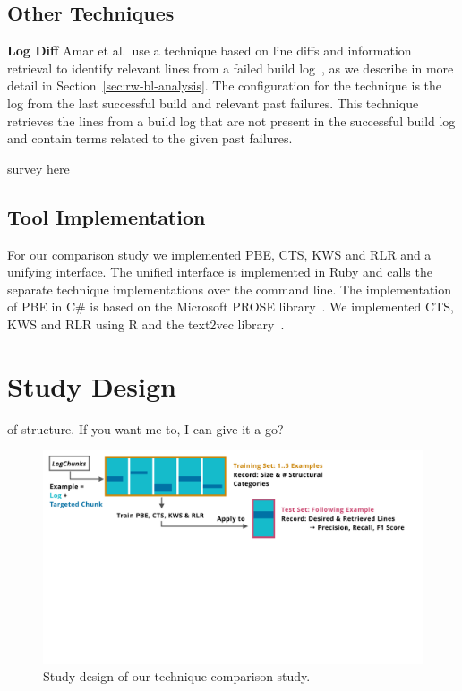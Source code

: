 
\subsection{Other Techniques}

\noindent
\textbf{Log Diff}
Amar et al.\ use a technique based on line diffs and information
retrieval to identify relevant lines from a failed build
log~\cite{amar2019mining}, as we describe in more detail in
Section~\ref{sec:rw-bl-analysis}.
The configuration for the technique
is the log from the last successful build and relevant past failures.
This technique retrieves the lines from a build log that are not
present in the successful build log and contain terms related to the
given past failures.

survey here

\subsection{Tool Implementation}
For our comparison study we implemented PBE, CTS, KWS and RLR and a
unifying interface.
The unified interface is implemented in Ruby and
calls the separate technique implementations over the command line.
The implementation of PBE in C\# is based on the Microsoft PROSE
library~\cite{prose2019webpage}.
We implemented CTS, KWS and RLR using
R and the text2vec library~\cite{text2vec2019webpage}.


\section{Study Design}
\label{sec:study}

of structure.
If you want me to, I can give it a go?
\begin{figure}[tb]
	\centering
	\includegraphics[width=\textwidth, trim={0.4cm 8.4cm 1.2cm 0.3cm},
	clip]{img/study.pdf}
	\caption{Study design of our technique comparison study.}
	\label{fig:study}
\end{figure}

